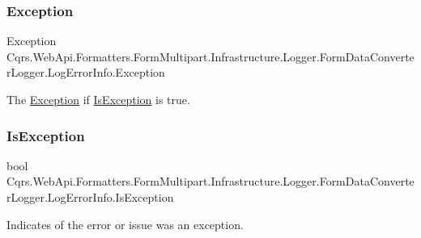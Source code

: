 \subsubsection{\texorpdfstring{Exception}{Exception}}
{\footnotesize\ttfamily Exception Cqrs.\+Web\+Api.\+Formatters.\+Form\+Multipart.\+Infrastructure.\+Logger.\+Form\+Data\+Converter\+Logger.\+Log\+Error\+Info.\+Exception\hspace{0.3cm}{\ttfamily [get]}}



The \hyperlink{classCqrs_1_1WebApi_1_1Formatters_1_1FormMultipart_1_1Infrastructure_1_1Logger_1_1FormDataConverterLogger_1_1LogErrorInfo_aca090100f80122a6a5ae5aa930f49e9b_aca090100f80122a6a5ae5aa930f49e9b}{Exception} if \hyperlink{classCqrs_1_1WebApi_1_1Formatters_1_1FormMultipart_1_1Infrastructure_1_1Logger_1_1FormDataConverterLogger_1_1LogErrorInfo_aea6dad38c7378ec2aa015c244924ec3b_aea6dad38c7378ec2aa015c244924ec3b}{Is\+Exception} is true. 

\mbox{\label{classCqrs_1_1WebApi_1_1Formatters_1_1FormMultipart_1_1Infrastructure_1_1Logger_1_1FormDataConverterLogger_1_1LogErrorInfo_aea6dad38c7378ec2aa015c244924ec3b_aea6dad38c7378ec2aa015c244924ec3b}} 
\subsubsection{\texorpdfstring{Is\+Exception}{IsException}}
{\footnotesize\ttfamily bool Cqrs.\+Web\+Api.\+Formatters.\+Form\+Multipart.\+Infrastructure.\+Logger.\+Form\+Data\+Converter\+Logger.\+Log\+Error\+Info.\+Is\+Exception\hspace{0.3cm}{\ttfamily [get]}}



Indicates of the error or issue was an exception. 

